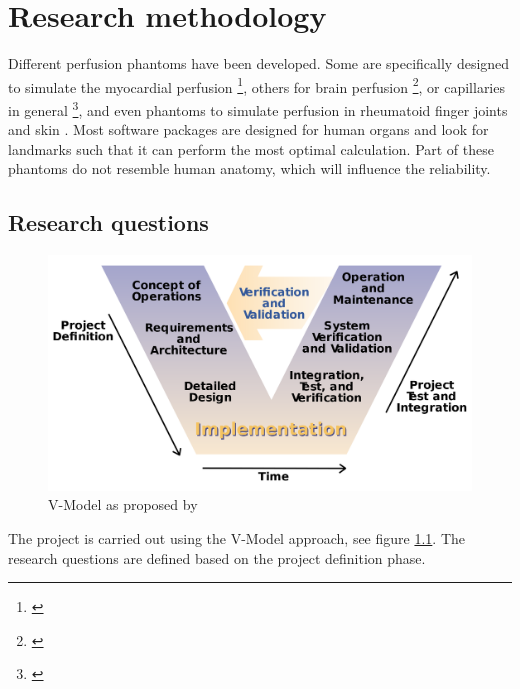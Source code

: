 \chapter{Research methodology}
\label{ch:res_metho}

Different perfusion phantoms have been developed. Some are specifically designed to simulate the myocardial perfusion \footnote{\citep{chiribiri2013perfusion, otton2013direct, o2017effect, o2017feasibility, teslow1991x}}, others for brain perfusion \footnote{\citep{hashimoto2018effect, suzuki2017quantitative, boese2013performance, mathys2012phantom, ebrahimi2010microfabricated, wang2010flow, noguchi2007quantitative, ganguly2012vitro, klotz1999perfusion}}, or capillaries in general \footnote{\citep{kim2016efficiency, anderson2011semipermeable, driscoll2011development, gauthier2011perfusion, veltmann2002design, lohmaier2004vitro}}, and even phantoms to simulate perfusion in rheumatoid finger joints \citep{sakano2015power} and skin \citep{kim2018multidimensional}. Most software packages are designed for human organs and look for landmarks such that it can perform the most optimal calculation. Part of these phantoms do not resemble human anatomy, which will influence the reliability.

\section{Research questions}
\begin{figure}[b!]
	\begin{center}
		\includegraphics[width=0.5\linewidth]{images/vmodel.png}
	\end{center}
	\caption{V-Model\citep{rook1986controlling} as proposed by \cite{osborne2005clarus}}
	\label{fig:vmodel}
\end{figure}

The project is carried out using the V-Model \citep{rook1986controlling,osborne2005clarus} approach, see figure \ref{fig:vmodel}. The research questions are defined based on the project definition phase.

